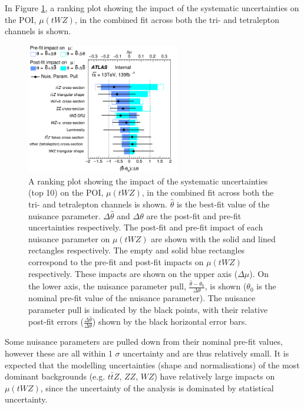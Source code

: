 In Figure \ref{fig:4lep-combined-nuisance-ranking}, a ranking plot showing the impact of the systematic uncertainties on the POI, $\mu (tWZ)$, in the combined fit across both the tri- and tetralepton channels is shown.
\begin{figure}
    \centering
    \includegraphics[width=0.6\textwidth]{figures/combined/RankingSysts_SigXsecOverSM_systs.png}
    \caption{A ranking plot showing the impact of the systematic uncertainties (top 10) on the POI, $\mu (tWZ)$, in the combined fit across both the tri- and tetralepton channels is shown. $\hat{\theta}$ is the best-fit value of the nuisance parameter. $\Delta \hat{\theta}$ and $\Delta\theta$ are the post-fit and pre-fit uncertainties respectively. The post-fit and pre-fit impact of each nuisance parameter on $\mu (tWZ)$ are shown with the solid and lined rectangles respectively. The empty and solid blue rectangles correspond to the pre-fit and post-fit impacts on $\mu (tWZ)$ respectively. These impacts are shown on the upper axis ($\Delta \mu$). On the lower axis, the nuisance parameter pull, $\frac{\hat{\theta} - \theta_{0}}{\Delta{\theta}}$, is shown ($\theta_{0}$ is the nominal pre-fit value of the nuisance parameter). The nuisance parameter pull is indicated by the black points, with their relative post-fit errors ($\frac{\Delta \hat{\theta}}{\Delta \theta}$) shown by the black horizontal error bars.}
    \label{fig:4lep-combined-nuisance-ranking}
\end{figure}

Some nuisance parameters are pulled down from their nominal pre-fit values, however these are all within 1 $\sigma$ uncertainty and are thus relatively small. It is expected that the modelling uncertainties (shape and normalisations) of the most dominant backgrounds (e.g. $t\bar{t}Z$, $ZZ$, $WZ$) have relatively large impacts on $\mu(tWZ)$, since the uncertainty of the analysis is dominated by statistical uncertainty.\\

